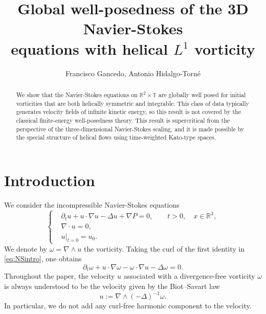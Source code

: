 \documentclass[11pt,a4paper]{article}
\title{Global well-posedness of the 3D Navier-Stokes\\ equations
with helical $L^1$ vorticity}
\author{Francisco Gancedo, Antonio Hidalgo-Torn\'e}
\newcommand{\R}{\mathbb{R}}
\begin{document}
	
\maketitle

\begin{abstract}
We show that the Navier-Stokes equations on $\mathbb R^2\times\mathbb T$
are globally well posed for initial vorticities that are both helically symmetric 
and integrable. This class of data typically generates velocity fields of infinite kinetic energy, so this result is not covered by the classical finite-energy well-posedness theory. This result is
supercritical from the perspective of the three-dimensional
Navier-Stokes scaling, and it is made possible by the special structure of
helical flows using
time-weighted Kato-type spaces. 
\end{abstract}
\section{Introduction}

We consider the incompressible Navier-Stokes equations
\begin{equation}\label{eq:NSintro}
\left\{
\begin{aligned}
    &\partial_t u + u\cdot\nabla u - \Delta u + \nabla P=0,
        \qquad t>0,\quad x\in\R^3,\\
    &\nabla\cdot u=0,\\
    &u|_{t=0}=u_0.
\end{aligned}
\right.
\end{equation}
We denote by
$
    \omega=\nabla\wedge u
$
the vorticity. Taking the curl of the first identity in \eqref{eq:NSintro}, one obtains
\begin{equation}\label{eq:vorticityintro}
    \partial_t\omega
    +u\cdot\nabla\omega
    -\omega\cdot\nabla u
    -\Delta\omega=0.
\end{equation}
Throughout the paper, the velocity $u$ associated with a divergence-free vorticity $\omega$ is always understood to be the velocity given by the Biot–Savart law
\[
u:=\nabla\wedge(-\Delta)^{-1}\omega.
\]
In particular, we do not add any curl-free harmonic component to the
velocity.
\end{document}
